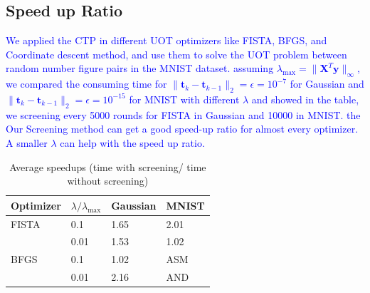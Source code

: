 \documentclass[twoside]{article}
\theoremstyle{plain}
\newcommand{\mat}[1]{\mathbf{#1}}
\renewcommand{\vec}[1]{\bm{#1}}
\newcommand{\changeXS}[1]{\textcolor{blue}{#1}}
\begin{document}
\subsection{Speed up Ratio}

\changeXS{We applied the CTP in different UOT optimizers like FISTA, BFGS, and Coordinate descent method, and use them to solve the UOT problem between random number figure pairs in the MNIST dataset. assuming $\lambda_{\max} = \|\mat X^{T}{\vec y}\|_{\infty} $, we compared the consuming time for $\|\vec t_k - \vec t_{k-1}\|_2 = \epsilon = 10^{-7}$ for Gaussian and  $\|\vec t_k - \vec t_{k-1}\|_2 = \epsilon = 10^{-15}$ for MNIST with different $\lambda$ and showed in the table, we screening every 5000 rounds for FISTA in Gaussian and 10000 in MNIST. the Our Screening method can get a good speed-up ratio for almost every optimizer. A smaller $\lambda$ can help with the speed up ratio.}



\begin{table}[htbp]        %
    \centering             %
    \label{tab:speedup}           %
    
\begin{tabular}[h]{ |p{1.5cm}|p{1.5cm}||p{1.8cm}|p{1.8cm}|  }

 \hline
 Optimizer&${\lambda/ \lambda_{\max}}$&Gaussian& MNIST\\
 \hline
 FISTA   &0.1& 1.65    & 2.01\\
              &0.01&   1.53  & 1.02 \\
 BFGS   &0.1&   1.02  & ASM\\
              &0.01&  2.16  & AND   \\
 \hline
\end{tabular}
\caption{Average speedups (time with screening/ time without screening)}
\end{table}
\end{document}
